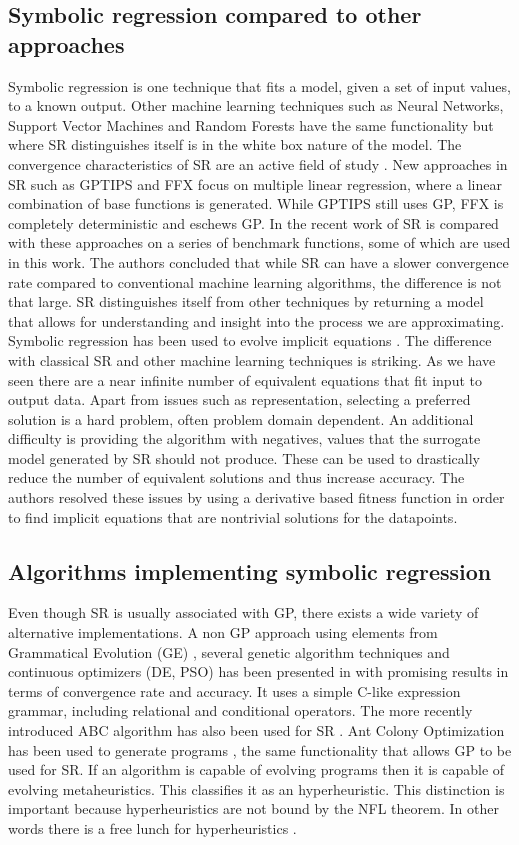 \subsection{Symbolic regression compared to other approaches}
Symbolic regression is one technique that fits a model, given a set of input values, to a known output. Other machine learning techniques such as Neural Networks, Support Vector Machines and Random Forests have the same functionality but where SR distinguishes itself is in the white box nature of the model. The convergence characteristics of SR are an active field of study \citep{SRAccur}. New approaches in SR such as GPTIPS and FFX \citep{GPTIPS, FFX} focus on multiple linear regression, where a linear combination of base functions is generated. While GPTIPS still uses GP, FFX is completely deterministic and eschews GP.
In the recent work of \citep{SRlinear} SR is compared with these approaches on a series of benchmark functions, some of which are used in this work. The authors concluded that while SR can have a slower convergence rate compared to conventional machine learning algorithms, the difference is not that large. SR distinguishes itself from other techniques by returning a model that allows for understanding and insight into the process we are approximating.
Symbolic regression has been used to evolve implicit equations \citep{SRimplicit}. The difference with classical SR and other machine learning techniques is striking. As we have seen there are a near infinite number of equivalent equations that fit input to output data. Apart from issues such as representation, selecting a preferred solution is a hard problem, often problem domain dependent. An additional difficulty is providing the algorithm with negatives, values that the surrogate model generated by SR should not produce. These can be used to drastically reduce the number of equivalent solutions and thus increase accuracy. The authors resolved these issues by using a derivative based fitness function in order to find implicit equations that are nontrivial solutions for the datapoints.

\subsection{Algorithms implementing symbolic regression}
Even though SR is usually associated with GP, there exists a wide variety of alternative implementations.
A non GP approach using elements from Grammatical Evolution (GE) \cite{GE}, several genetic algorithm techniques and continuous optimizers (DE, PSO) has been presented in \citep{AEG} with promising results in terms of convergence rate and accuracy. 
It uses a simple C-like expression grammar, including relational and conditional operators. 
The more recently introduced ABC algorithm has also been used for SR \cite{ABCSR}. 
Ant Colony Optimization \citep{ACO} has been used to generate programs \citep{ACOSR}, the same functionality that allows GP to be used for SR.
If an algorithm is capable of evolving programs then it is capable of evolving metaheuristics. This classifies it as an hyperheuristic. This distinction is important because hyperheuristics are not bound by the NFL theorem. In other words there is a free lunch for hyperheuristics \cite{HyperNFL}. 

